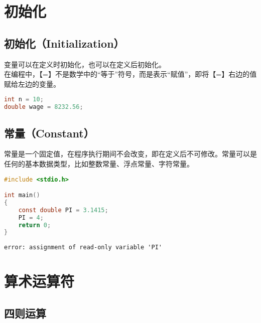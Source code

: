 \newpage

\section{初始化}

\subsection{初始化（Initialization）}

变量可以在定义时初始化，也可以在定义后初始化。\\

在编程中，【=】不是数学中的“等于”符号，而是表示“赋值”，即将【=】右边的值赋给左边的变量。

\vspace{-0.5cm}

\begin{lstlisting}[language=C]
int n = 10;
double wage = 8232.56;
\end{lstlisting}

\vspace{0.5cm}

\subsection{常量（Constant）}

常量是一个固定值，在程序执行期间不会改变，即在定义后不可修改。常量可以是任何的基本数据类型，比如整数常量、浮点常量、字符常量。\\


\begin{lstlisting}[language=C]
#include <stdio.h>

int main()
{
	const double PI = 3.1415;
	PI = 4;
	return 0;
}
\end{lstlisting}

\begin{tcolorbox}
	\begin{verbatim}
error: assignment of read-only variable 'PI'
	\end{verbatim}
\end{tcolorbox}

\newpage

\section{算术运算符}

\subsection{四则运算}

